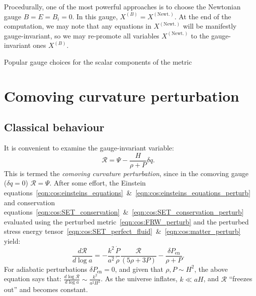 Procedurally, one of  the most powerful approaches is to choose the Newtonian gauge ${B=E=B_i=0}$. In this gauge, $X^{(B)}=X^{(\text{Newt.})}$. At the end of the computation, we may note that any equations in $X^{(\text{Newt.})}$ will be manifestly gauge-invariant, so we may re-promote all variables $X^{(\text{Newt.})}$ to the gauge-invariant ones $X^{(B)}$.


\begin{table}
  \centering
  
\caption{Popular gauge choices for the scalar components of the metric}\label{tab:cos:gauge_choice}
\end{table}

\section{Comoving curvature perturbation}

\subsection{Classical behaviour}
It is convenient to examine the gauge-invariant variable:
\begin{equation}
  \mathcal{R} = \Psi - \frac{H}{\rho+P}\delta q.
  \label{eqn:cos:CCP}
\end{equation}
This is termed the {\em comoving curvature perturbation}, since in the comoving gauge ($\delta q=0$) $\mathcal{R}=\Psi$.
After some effort, the Einstein equations~\eqref{eqn:cos:einsteins_equations}~\&~\eqref{eqn:cos:einsteins_equations_perturb} and conservation equations~\eqref{eqn:cos:SET_conservation}~\&~\eqref{eqn:cos:SET_conservation_perturb} evaluated using the perturbed metric~\eqref{eqn:cos:FRW_perturb} and the perturbed stress energy tensor~\eqref{eqn:cos:SET_perfect_fluid}~\&~\eqref{eqn:cos:matter_perturb} yield:
\begin{equation}
  \frac{d \mathcal{R}}{d \log a} = 
  -\frac{k^2}{a^2}\frac{\dot{P}}{\dot{\rho}}\frac{\mathcal{R}}{(5\rho + 3P)}
  -\frac{\delta P_\mathrm{en}}{\rho+P}.
\end{equation}
For adiabatic perturbations $\delta P_\mathrm{en}=0$, and given that $\rho,P\sim H^2$, the above equation says that: $\frac{d\log \mathcal{R}}{d\log a} \sim \frac{k^2}{a^2H^2}$. As the universe inflates, $k\ll aH$, and $\mathcal{R}$ ``freezes out'' and becomes constant.

